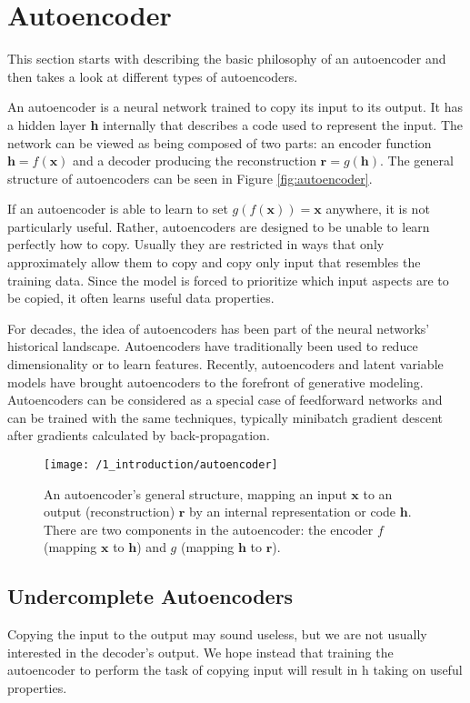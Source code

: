 \section{Autoencoder}\label{chap:background}
This section starts with describing the basic philosophy of an autoencoder and
then takes a look at different types of autoencoders.

An autoencoder is a neural network trained to copy its input to its output. It
has a hidden layer \textbf{h} internally that describes a code used to represent
the input. The network can be viewed as being composed of two parts: an encoder
function $\textbf{h} = f(\textbf{x})$ and a decoder producing the reconstruction
$\textbf{r} = g(\textbf{h})$. The general structure of autoencoders can be seen
in Figure \ref{fig:autoencoder}.

If an autoencoder is able to learn to set $g(f(\textbf{x}))=\textbf{x}$
anywhere, it is not particularly useful. Rather, autoencoders are designed to be
unable to learn perfectly how to copy. Usually they are restricted in ways that
only approximately allow them to copy and copy only input that resembles the
training data. Since the model is forced to prioritize which input aspects are
to be copied, it often learns useful data properties. 

For decades, the idea of autoencoders has been part of the neural networks'
historical landscape. Autoencoders have traditionally been used to reduce
dimensionality or to learn features. Recently, autoencoders and latent variable
models have brought autoencoders to the forefront of generative modeling.
Autoencoders can be considered as a special case of feedforward networks and can
be trained with the same techniques, typically minibatch gradient descent after
gradients calculated by back-propagation. 

\begin{figure}[h]
    \centering
    \texttt{[image: /1\_introduction/autoencoder]}
    \caption{An autoencoder's general structure, mapping an input $\textbf{x}$
    to an output (reconstruction) $\textbf{r}$ by an internal representation or
    code $\textbf{h}$. There are two components in the autoencoder: the encoder
    $f$ (mapping $\textbf{x}$ to $\textbf{h}$) and $g$ (mapping $\textbf{h}$ to
    $\textbf{r}$).}
\end{figure}


\subsection{Undercomplete Autoencoders}
Copying the input to the output may sound useless, but we are not usually
interested in the decoder's output. We hope instead that training the
autoencoder to perform the task of copying input will result in h taking on
useful properties.

